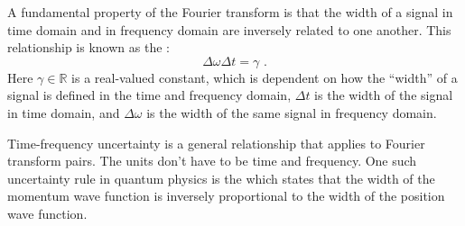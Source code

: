 A fundamental property of the Fourier transform is that the width of a
signal in time domain and in frequency domain are inversely related to
one another. This relationship is known as
the \emph{}:
\begin{equation}
  \boxed{
    \Delta \omega \Delta t = \gamma
  } \,\,.
  \label{eq:uncertainty}
\end{equation}
Here $\gamma \in \mathbb{R}$ is a real-valued constant, which is
dependent on how the ``width'' of a signal is defined in the time and
frequency domain, $\Delta t$ is the width of the signal in
time domain, and $\Delta \omega$ is the width of the same signal in
frequency domain.

Time-frequency uncertainty is a general relationship that applies to
Fourier transform pairs. The units don't have to be time and frequency.
One such uncertainty rule in quantum physics is
the \emph{} which states that the width of the momentum
wave function is inversely proportional to the width of the position
wave function.

